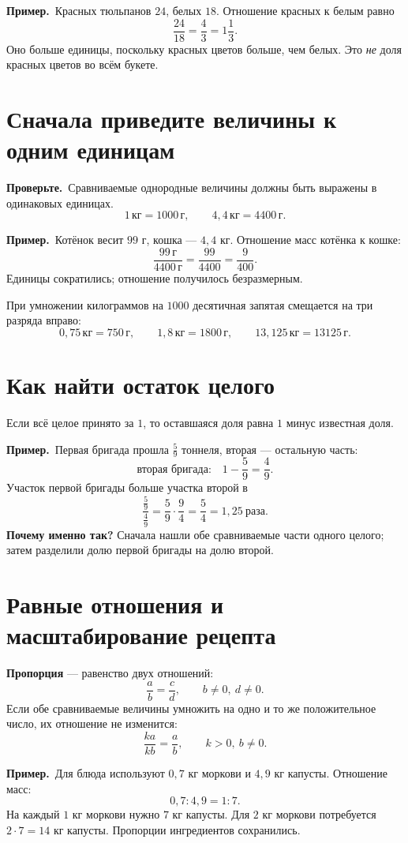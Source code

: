 \documentclass[a4paper,12pt]{article}
\newcommand{\ex}[1]{\par\textcolor{darkaccent}{\textbf{Пример.}}\ #1}
\newcommand{\warn}[1]{\textcolor{darkaccent}{\textbf{Проверьте.}}\ #1}
\begin{document}
\ex{Красных тюльпанов $24$, белых $18$. Отношение красных к белым равно}
\[
\frac{24}{18}=\frac43=1\frac13.
\]
Оно больше единицы, поскольку красных цветов больше, чем белых. Это \emph{не} доля красных цветов во всём букете.

\section{Сначала приведите величины к одним единицам}

\warn{Сравниваемые однородные величины должны быть выражены в одинаковых единицах.}
\[
1\,\text{кг}=1000\,\text{г},\qquad 4{,}4\,\text{кг}=4400\,\text{г}.
\]
\ex{Котёнок весит $99$ г, кошка --- $4{,}4$ кг. Отношение масс котёнка к кошке:}
\[
\frac{99\,\text{г}}{4400\,\text{г}}=\frac{99}{4400}=\frac9{400}.
\]
Единицы сократились; отношение получилось безразмерным.

При умножении килограммов на $1000$ десятичная запятая смещается на три разряда вправо:
\[
0{,}75\,\text{кг}=750\,\text{г},\qquad
1{,}8\,\text{кг}=1800\,\text{г},\qquad
13{,}125\,\text{кг}=13125\,\text{г}.
\]

\section{Как найти остаток целого}

Если всё целое принято за $1$, то оставшаяся доля равна $1$ минус известная доля.

\ex{Первая бригада прошла $\frac59$ тоннеля, вторая --- остальную часть:}
\[
\text{вторая бригада:}\quad 1-\frac59=\frac49.
\]
Участок первой бригады больше участка второй в
\[
\frac{\frac59}{\frac49}=\frac59\cdot\frac94=\frac54=1{,}25\ \text{раза}.
\]
\textbf{Почему именно так?} Сначала нашли обе сравниваемые части одного целого; затем разделили долю первой бригады на долю второй.

\section{Равные отношения и масштабирование рецепта}

\textbf{Пропорция} --- равенство двух отношений:
\[
\frac{a}{b}=\frac{c}{d},\qquad b\ne0,\ d\ne0.
\]
Если обе сравниваемые величины умножить на одно и то же положительное число, их отношение не изменится:
\[
\frac{ka}{kb}=\frac ab,\qquad k>0,\ b\ne0.
\]
\ex{Для блюда используют $0{,}7$ кг моркови и $4{,}9$ кг капусты. Отношение масс:}
\[
0{,}7:4{,}9=1:7.
\]
На каждый $1$ кг моркови нужно $7$ кг капусты. Для $2$ кг моркови потребуется $2\cdot7=14$ кг капусты. Пропорции ингредиентов сохранились.
\end{document}
